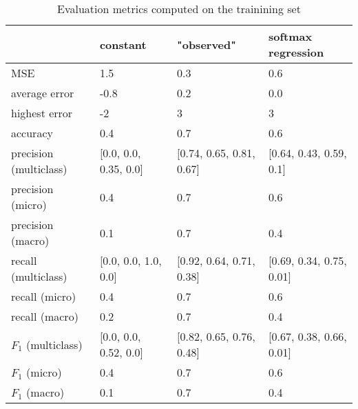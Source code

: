 \begin{table}[H]
\caption{Evaluation metrics computed on the trainining set}
\label{tbl:sais_eval_trainining}
\begin{tabular}{llll}
\toprule
 & constant & "observed" & softmax regression \\
\midrule
MSE & 1.5 & 0.3 & 0.6 \\
average error & -0.8 & 0.2 & 0.0 \\
highest error & -2 & 3 & 3 \\
accuracy & 0.4 & 0.7 & 0.6 \\
precision (multiclass) & [0.0, 0.0, 0.35, 0.0] & [0.74, 0.65, 0.81, 0.67] & [0.64, 0.43, 0.59, 0.1] \\
precision (micro) & 0.4 & 0.7 & 0.6 \\
precision (macro) & 0.1 & 0.7 & 0.4 \\
recall (multiclass) & [0.0, 0.0, 1.0, 0.0] & [0.92, 0.64, 0.71, 0.38] & [0.69, 0.34, 0.75, 0.01] \\
recall (micro) & 0.4 & 0.7 & 0.6 \\
recall (macro) & 0.2 & 0.7 & 0.4 \\
$F_1$ (multiclass) & [0.0, 0.0, 0.52, 0.0] & [0.82, 0.65, 0.76, 0.48] & [0.67, 0.38, 0.66, 0.01] \\
$F_1$ (micro) & 0.4 & 0.7 & 0.6 \\
$F_1$ (macro) & 0.1 & 0.7 & 0.4 \\
\bottomrule
\end{tabular}
\end{table}
